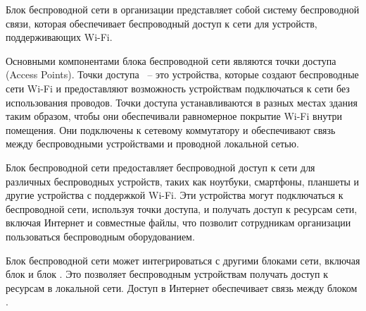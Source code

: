 Блок беспроводной сети в организации представляет собой систему беспроводной связи, 
которая обеспечивает беспроводный доступ к сети для устройств, поддерживающих Wi-Fi.

Основными компонентами блока беспроводной сети являются точки доступа (Access Points). 
Точки доступа ~-- это устройства, которые создают беспроводные сети Wi-Fi и предоставляют возможность устройствам подключаться к сети без использования проводов.
Точки доступа устанавливаются в разных местах здания таким образом, чтобы они обеспечивали равномерное покрытие Wi-Fi внутри помещения.
Они подключены к сетевому коммутатору и обеспечивают связь между беспроводными устройствами и проводной локальной сетью.

Блок беспроводной сети предоставляет беспроводной доступ к сети для различных беспроводных устройств, 
таких как ноутбуки, смартфоны, планшеты и другие устройства с поддержкой Wi-Fi. 
Эти устройства могут подключаться к беспроводной сети, используя точки доступа, и получать доступ к ресурсам сети, 
включая Интернет и совместные файлы, что позволит сотрудникам организации пользоваться беспроводным оборудованием.

Блок беспроводной сети может интегрироваться с другими блоками сети, включая блок \blockDevices и блок \blockVideo\@. 
Это позволяет беспроводным устройствам получать доступ к ресурсам в локальной сети. Доступ в Интернет обеспечивает связь между блоком \blockSwith\@.